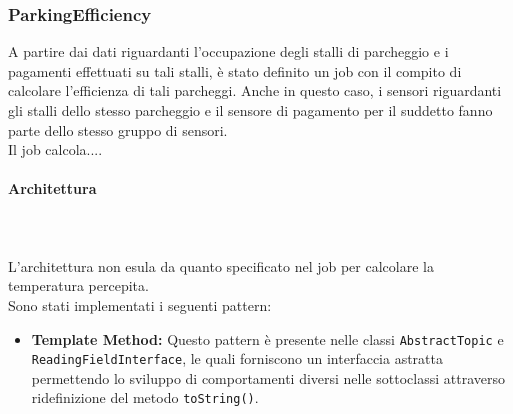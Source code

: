 \documentclass[8pt]{article}
\newcommand{\subsubsubsection}[1]{\paragraph{#1}\mbox{}\\\\}
\begin{document}
\subsubsection{ParkingEfficiency}
A partire dai dati riguardanti l'occupazione degli stalli di parcheggio e i pagamenti effettuati su tali stalli, è stato definito un job con il compito di calcolare l'efficienza di tali parcheggi. Anche in questo caso, i sensori riguardanti gli stalli dello stesso parcheggio e il sensore di pagamento per il suddetto fanno parte dello stesso gruppo di sensori.
\\Il job calcola....
\subsubsubsection{Architettura}
L'architettura non esula da quanto specificato nel job per calcolare la temperatura percepita.
\\Sono stati implementati i seguenti pattern:
\begin{itemize}
    \item \textbf{Template Method:}
    Questo pattern è presente nelle classi \verb|AbstractTopic| e \verb|ReadingFieldInterface|, le quali forniscono un interfaccia astratta permettendo lo sviluppo di comportamenti diversi nelle sottoclassi attraverso ridefinizione del metodo \verb|toString()|.
\end{itemize}
\end{document}
